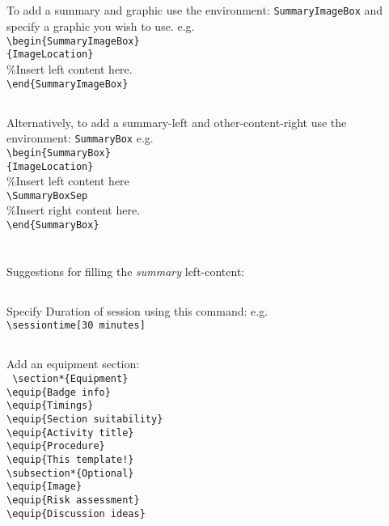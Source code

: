 \documentclass[a4paper]{GreyWolfsScoutActivityTemplate}
\begin{document}
\begin{ActivityProcedure}
\subsection{}
To add a summary and graphic use the environment: {\tt SummaryImageBox} and specify a graphic you wish to use. e.g.\\
{\tt \textbackslash{}begin\{SummaryImageBox\}\\\hspace*{5mm}\{ImageLocation\}}\\
\%Insert left content here.\\
{\tt \textbackslash{}end\{SummaryImageBox\}}

\subsection{}
Alternatively, to add a summary-left and other-content-right use the environment: {\tt SummaryBox} e.g.\\ 
{\tt \textbackslash{}begin\{SummaryBox\}\\\hspace*{5mm}\{ImageLocation\}}\\
\%Insert left content here\\
{\tt \textbackslash{}SummaryBoxSep}\\
\%Insert right content here.\\
{\tt \textbackslash{}end\{SummaryBox\}}

\section{}
Suggestions for filling the \textit{summary} left-content:

\subsection{}
Specify Duration of session using this command: e.g.\\
{\tt \textbackslash{}sessiontime[30~minutes]}

\subsection{}
Add an equipment section:\\
{\tt \small{
\textbackslash{}section*\{Equipment\}\\
\textbackslash{}equip\{Badge info\}\\
\textbackslash{}equip\{Timings\}\\
\textbackslash{}equip\{Section suitability\}\\
\textbackslash{}equip\{Activity title\}\\
\textbackslash{}equip\{Procedure\}\\
\textbackslash{}equip\{This template!\}\\
\textbackslash{}subsection*\{Optional\}\\
\textbackslash{}equip\{Image\}\\
\textbackslash{}equip\{Risk assessment\}\\
\textbackslash{}equip\{Discussion ideas\}
}}


\end{ActivityProcedure}
\end{document}
